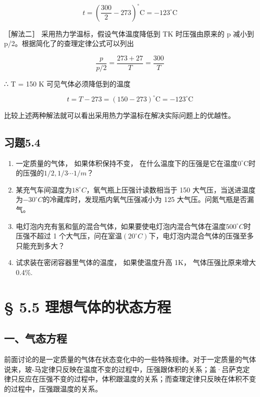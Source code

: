 \[
t = \left(\frac {300}{2} - 273\right) ^ {\circ} \mathrm{C} = - 123 ^ {\circ} \mathrm{C}
\]

［解法二］ 采用热力学温标，假设气体温度降低到 TK 时压强由原来的 p 减小到
p/2。根据简化了的查理定律公式可以列出

\[
\frac{p}{p/2}=\frac{273+27}{T}=\frac{300}{T}
\]

∴ T = 150 K 可见气体必须降低到的温度

\[
t = T - 273 = (150 - 273) ^ {\circ} \mathrm{C} = - 123 ^ {\circ} \mathrm{C}
\]

比较上述两种解法就可以看出采用热力学温标在解决实际问题上的优越性。

\subsection{习题5.4}\label{ux4e60ux98985.4}

\begin{enumerate}
\def\labelenumi{\arabic{enumi}.}
\item
  一定质量的气体， 如果体积保持不变，
  在什么温度下的压强是它在温度\(0^{\circ} \mathrm{C}\)时的压强的\(1 / 2, 1 / 3 \cdots 1 / m\)？
\item
  某充气车间温度为\(18^{\circ}C\)，氧气瓶上压强计读数相当于 150
  大气压，当送进温度为\(-30^{\circ}C\)的冷藏库时，发现瓶内氧气压强减小为
  125 大气压。问氮气瓶是否漏气。
\item
  电灯泡内充有氢和氩的混合气体，如果要使电灯泡内混合气体在温度\(500^{\circ}C\)时压强不超过
  1
  个大气压，问在室温\((20^{\circ}C)\)下，电灯泡内混合气体的压强至多只能充到多大？
\item
  试求装在密闭容器里气体的温度， 如果使温度升高 1K， 气体压强比原来增大
  0.4\%.
\end{enumerate}

\section{§ 5.5
理想气体的状态方程}\label{ux7406ux60f3ux6c14ux4f53ux7684ux72b6ux6001ux65b9ux7a0b}

\subsection{一、气态方程}\label{ux4e00ux6c14ux6001ux65b9ux7a0b}

前面讨论的是一定质量的气体在状态变化中的一些特殊规律。对于一定质量的气体说来，玻-马定律只反映在温度不变的过程中，压强跟体积的关系；盖·吕萨克定律只反应在压强不变的过程中，体积跟温度的关系；而查理定律只反映在体积不变的过程中，压强跟温度的关系。

